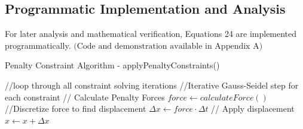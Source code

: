 \documentclass[12pt, letterpaper]{article}
\begin{document}
\subsection{Programmatic Implementation and Analysis}
\hspace{\parindent} For later analysis and mathematical verification, Equations 24 are implemented programmatically. $\text{(Code and demonstration available in Appendix A)}$
\begin{algorithm}[H]
\caption{Penalty Constraint Algorithm - applyPenaltyConstraints()}
\begin{algorithmic}[1]
\STATE //loop through all constraint solving iterations
    \STATE //Iterative Gauss-Seidel step for each constraint
        \STATE // Calculate Penalty Forces
        \STATE $force \leftarrow calculateForce()$
        \STATE //Discretize force to find displacement
        \STATE $\Delta x \leftarrow force \cdot \Delta t$
        \STATE // Apply displacement
        \STATE $x \leftarrow x + \Delta x$
    \ENDFOR
\ENDFOR
\end{algorithmic}
\end{algorithm}
\end{document}
